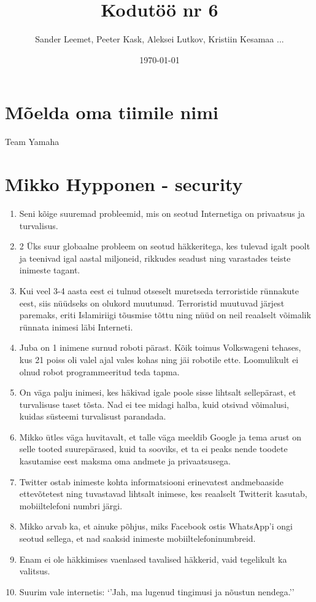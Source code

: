 \documentclass{article}
\title{Kodutöö nr 6}
\author{Sander Leemet, Peeter Kask, Aleksei Lutkov, Kristiin Kesamaa ...}
\date{\today}
\begin{document}
\maketitle

\section{Mõelda oma tiimile nimi}
Team Yamaha

\section{Mikko Hypponen - security}
\begin{enumerate}
	\item{Seni kõige suuremad probleemid, mis on seotud Internetiga on privaatsus ja turvalisus.}
	\item{2 Üks suur globaalne probleem on seotud häkkeritega, kes tulevad igalt poolt ja teenivad igal aastal miljoneid, rikkudes seadust ning varastades teiste inimeste tagant.}
	\item{Kui veel 3-4 aasta eest ei tulnud otseselt muretseda terroristide rünnakute eest, siis nüüdseks on olukord muutunud. Terroristid muutuvad järjest paremaks, eriti Islamiriigi tõusmise tõttu ning nüüd on neil reaalselt võimalik rünnata inimesi läbi Interneti.}
	\item{Juba on 1 inimene surnud roboti pärast. Kõik toimus Volkswageni tehases, kus 21 poiss oli valel ajal vales kohas ning jäi robotile ette. Loomulikult ei olnud robot programmeeritud teda tapma.}
	\item{On väga palju inimesi, kes häkivad igale poole sisse lihtsalt sellepärast, et turvalisuse taset tõsta. Nad ei tee midagi halba, kuid otsivad võimalusi, kuidas süsteemi turvalisust parandada.}
	\item{Mikko ütles väga huvitavalt, et talle väga meeldib Google ja tema arust on selle tooted suurepärased, kuid ta sooviks, et ta ei peaks nende toodete kasutamise eest maksma oma andmete ja privaatsusega.}
	\item{Twitter ostab inimeste kohta informatsiooni erinevatest andmebaaside ettevõtetest ning tuvastavad lihtsalt inimese, kes reaalselt Twitterit kasutab, mobiiltelefoni numbri järgi.}
	\item{Mikko arvab ka, et ainuke põhjus, miks Facebook ostis WhatsApp’i ongi seotud sellega, et nad saaksid inimeste mobiiltelefoninumbreid.}
	\item{Enam ei ole häkkimises vaenlased tavalised häkkerid, vaid tegelikult ka valitsus.}
	\item{Suurim vale internetis: ‘’Jah, ma lugenud tingimusi ja nõustun nendega.’’}


\end{enumerate}
\end{document}
